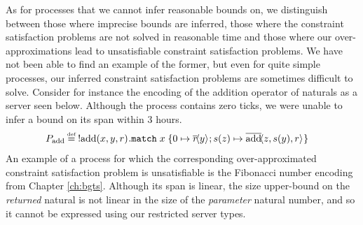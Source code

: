 As for processes that we cannot infer reasonable bounds on, we distinguish between those where imprecise bounds are inferred, those where the constraint satisfaction problems are not solved in reasonable time and those where our over-approximations lead to unsatisfiable constraint satisfaction problems. We have not been able to find an example of the former, but even for quite simple processes, our inferred constraint satisfaction problems are sometimes difficult to solve. Consider for instance the encoding of the addition operator of naturals as a server seen below. Although the process contains zero ticks, we were unable to infer a bound on its span within $3$ hours. 
\begin{align*}
    P_\text{add}\defeq&\;\bang\inputch{\text{add}}{x,y,r}{}{
        \texttt{match}\; x\; \{
             0 \mapsto \asyncoutputch{r}{y}{};
            \succc{z} \mapsto \asyncoutputch{\text{add}}{z,\succc{y},r}{}\}}
\end{align*}
An example of a process for which the corresponding over-approximated constraint satisfaction problem is unsatisfiable is the Fibonacci number encoding from Chapter \ref{ch:bgts}. Although its span is linear, the size upper-bound on the \textit{returned} natural is not linear in the size of the \textit{parameter} natural number, and so it cannot be expressed using our restricted server types.
%

% 
% 
% 
% 
% 

